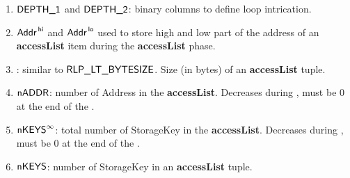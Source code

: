 \begin{enumerate}
\begin{enumerate}
                \begin{enumerate}
                    \item $\textsf{DEPTH\_1}$ and $\textsf{DEPTH\_2}$:
                        binary columns to define loop intrication.
                    \item $\textsf{Addr}^{\mathsf{\,hi}}$ and $\textsf{Addr}^{\mathsf{\,lo}}$ used to store high and low part of the address of an \textbf{accessList} item during the \textbf{accessList} phase.
                    \item {}:
                        similar to $\textsf{RLP\_LT\_BYTESIZE}$. Size (in bytes) of an \textbf{accessList} tuple.
                    \item $\textsf{nADDR}$:
                        number of Address in the \textbf{accessList}. Decreases during , must be 0 at the end of the .
                    \item $\textsf{nKEYS}^\infty$:
                        total number of StorageKey in the \textbf{accessList}. Decreases during , must be 0 at the end of the .
                    \item $\textsf{nKEYS}$:
                        number of StorageKey in an \textbf{accessList} tuple.
                \end{enumerate}
        \end{enumerate}
\end{enumerate}
